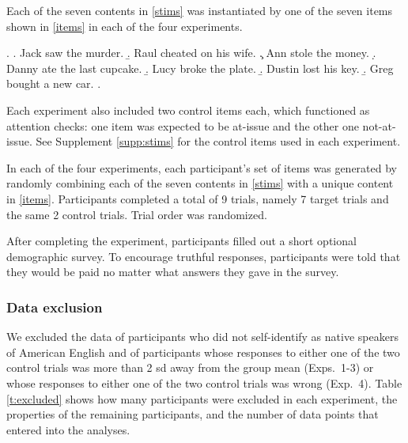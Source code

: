 \documentclass[times,linguex]{glossa}
\begin{document}
  Each of the seven contents in \ref{stims} was instantiated by one of the seven items shown in \ref{items} in each of the four experiments.
 
 \ex.\label{items}
 \a. Jack saw the murder.
 \b. Raul cheated on his wife.
 \c. Ann stole the money.
 \d. Danny ate the last cupcake.
 \b. Lucy broke the plate.
 \b. Dustin lost his key.
 \b. Greg bought a new car.
 \z.
 
 Each experiment also included two control items each, which functioned as attention checks: one item was expected to be at-issue and the other one not-at-issue. See Supplement \ref{supp:stims} for the control items used in each experiment.
 
 In each of the four experiments, each participant's set of items was generated by randomly combining each of the seven contents in \ref{stims} with a unique content in \ref{items}. Participants completed a total of 9 trials, namely 7 target trials and the same 2 control trials. Trial order was randomized.
 
After completing the experiment, participants filled out a short optional demographic survey. To encourage truthful responses, participants were told that they would be paid no matter what answers they gave in the survey. 

  \subsubsection{Data exclusion}
    
  We excluded the data of participants who did not self-identify as native speakers of
  American English and of participants whose responses to either one of the two control trials was more than 2 sd away from the group mean (Exps.~1-3) or whose responses to either one of the two control trials was wrong (Exp.~4).   Table \ref{t:excluded} shows how many participants were excluded in each experiment, the properties of the remaining participants, and the number of data points that entered into the analyses.
\end{document}

